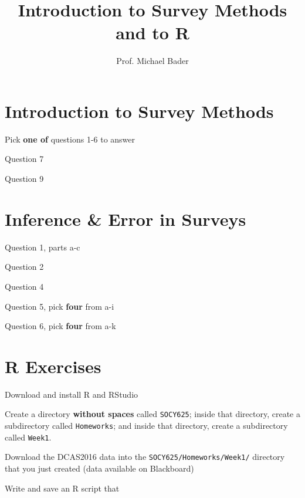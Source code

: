 \documentclass[11pt]{homework}
\title{Introduction to Survey Methods and to R}
\author{Prof. Michael Bader}
\begin{document}
\maketitle 

\begin{questions}
\section{Introduction to Survey Methods}
\question Pick \textbf{one of} questions 1-6 to answer 

\question Question 7

\question Question 9

\section{Inference \& Error in Surveys}

\question Question 1, parts a-c

\question Question 2

\question Question 4

\question Question 5, pick \textbf{four} from a-i

\question Question 6, pick \textbf{four} from a-k

\section{R Exercises}

\question Download and install R and RStudio

\question Create a directory \textbf{without spaces} called \texttt{SOCY625}; inside that directory, create a subdirectory called \texttt{Homeworks}; and inside that directory, create a subdirectory called \texttt{Week1}. 

\question Download the DCAS2016 data into the \texttt{SOCY625/Homeworks/Week1/} directory that you just created (data available on Blackboard)

\question Write and save an R script that 
\end{questions}
\end{document}
